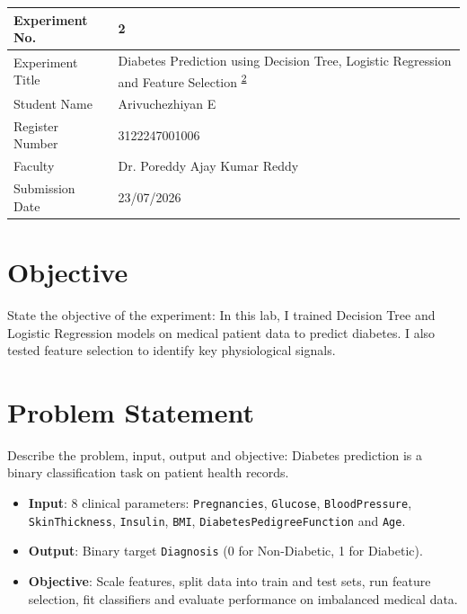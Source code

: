 \documentclass[12pt,a4paper]{article}
\begin{document}
\newpage


\begin{tabular}{|p{4cm}|p{11cm}|}
\hline
Experiment No. & 2 \\ \hline
Experiment Title & Diabetes Prediction using Decision Tree, Logistic Regression and Feature Selection \textsuperscript{\href{https://github.com/arivuchezhiyan/Machine_Learning}{2}} \\ \hline
Student Name & Arivuchezhiyan E \\ \hline
Register Number & 3122247001006 \\ \hline
Faculty & Dr. Poreddy Ajay Kumar Reddy \\ \hline
Submission Date & 23/07/2026 \\ \hline
\end{tabular}

\section{Objective}
State the objective of the experiment:
In this lab, I trained Decision Tree and Logistic Regression models on medical patient data to predict diabetes. I also tested feature selection to identify key physiological signals.

\section{Problem Statement}
Describe the problem, input, output and objective:
Diabetes prediction is a binary classification task on patient health records.
\begin{itemize}
\item \textbf{Input}: 8 clinical parameters: \texttt{Pregnancies}, \texttt{Glucose}, \texttt{BloodPressure}, \texttt{SkinThickness}, \texttt{Insulin}, \texttt{BMI}, \texttt{DiabetesPedigreeFunction} and \texttt{Age}.
\item \textbf{Output}: Binary target \texttt{Diagnosis} (0 for Non-Diabetic, 1 for Diabetic).
\item \textbf{Objective}: Scale features, split data into train and test sets, run feature selection, fit classifiers and evaluate performance on imbalanced medical data.
\end{itemize}
\end{document}
